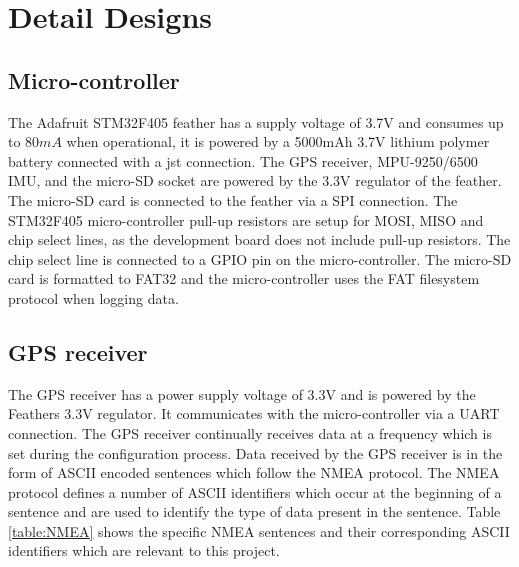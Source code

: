 \graphicspath{{detail_design/fig/}}

\chapter{Detail Designs}
\label{chap:detail_design}

\section{Micro-controller}
The Adafruit STM32F405 feather has a supply voltage of 3.7V and consumes up to $80mA$ when operational, it is powered by a 5000mAh 3.7V lithium polymer 
battery connected with a jst connection. The GPS receiver, MPU-9250/6500 IMU, and the micro-SD socket are powered by the 3.3V regulator of the feather. 
The micro-SD card is connected to the feather via a SPI connection. The STM32F405 micro-controller pull-up resistors are setup for MOSI, MISO and 
chip select lines, as the development board does not include pull-up resistors. The chip select line is connected to a GPIO pin on the micro-controller.
The micro-SD card is formatted to FAT32 and the micro-controller uses the FAT filesystem protocol when logging data.


\section{GPS receiver}
The GPS receiver has a power supply voltage of 3.3V and is powered by the Feathers 3.3V regulator. It communicates with the micro-controller via a 
UART connection. The GPS receiver continually receives data at a frequency which is set during the configuration process. Data received by the GPS 
receiver is in the form of ASCII encoded sentences which follow the NMEA protocol\cite{nmea}. The NMEA protocol defines a number of ASCII identifiers which occur 
at the beginning of a sentence and are used to identify the type of data present in the sentence. Table \ref{table:NMEA} shows the specific NMEA sentences and 
their corresponding ASCII identifiers which are relevant to this project.
\\

